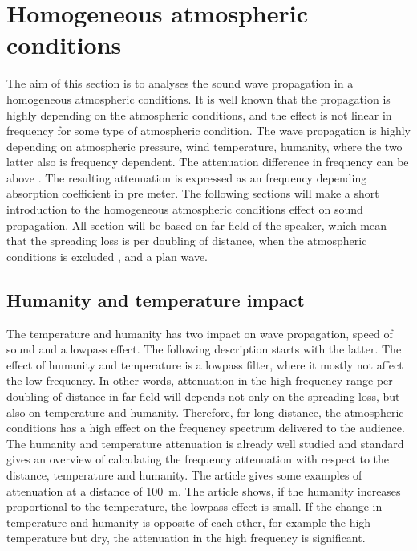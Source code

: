 \section{Homogeneous atmospheric conditions}
The aim of this section is to analyses the sound wave propagation in a homogeneous atmospheric conditions. It is well known that the propagation is highly depending on the atmospheric conditions, and the effect is not linear in frequency for some type of atmospheric condition. The wave propagation is highly depending on atmospheric pressure, wind temperature, humanity, where the two latter also is frequency dependent. The attenuation difference in frequency can be above  \citep{corteel2017large}. The resulting attenuation is expressed as an frequency depending absorption coefficient in \db pre \si{meter}. The following sections will make a short introduction to the homogeneous atmospheric conditions effect on sound propagation. All section will be based on far field of the speaker, which mean that the spreading loss is  per doubling of distance, when the atmospheric conditions is excluded \citep{bauman2001wavefront}, and a plan wave. 


\subsection{Humanity and temperature impact}\label{sec:ana:hu_temp}
The temperature and humanity has two impact on wave propagation, speed of sound and a lowpass effect. The following description starts with the latter. The effect of humanity and temperature is a lowpass filter, where it mostly not affect the low frequency. In other words, attenuation in the high frequency range per doubling of distance in far field will depends not only on the spreading loss, but also on temperature and humanity. Therefore, for long distance, the atmospheric conditions has a high effect on the frequency spectrum delivered to the audience. The humanity and temperature attenuation is already well studied and standard  \citep{iso_9613-1} gives an overview of calculating the frequency attenuation with respect to the distance, temperature and humanity. The article \citep{corteel2017large} gives some examples of attenuation at a distance of \SI{100}{\meter}. The article \citep{corteel2017large} shows, if the humanity increases proportional to the temperature, the lowpass effect is small. If the change in temperature and humanity is opposite of each other, for example the high temperature but dry, the attenuation in the high frequency is significant. 


